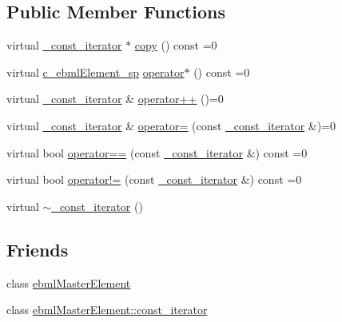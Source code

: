 \subsection*{Public Member Functions}
\begin{DoxyCompactItemize}
\item 
virtual \mbox{\hyperlink{classebml_1_1ebmlMasterElement_1_1__const__iterator}{\+\_\+const\+\_\+iterator}} $\ast$ \mbox{\hyperlink{classebml_1_1ebmlMasterElement_1_1__const__iterator_a64a4853ad363358987eb6492579cd503}{copy}} () const =0
\item 
virtual \mbox{\hyperlink{namespaceebml_a2deef4e8071531b32e3533f1bf978917}{c\+\_\+ebml\+Element\+\_\+sp}} \mbox{\hyperlink{classebml_1_1ebmlMasterElement_1_1__const__iterator_aa3e5459826695a9043745fbbaea9cd47}{operator$\ast$}} () const =0
\item 
virtual \mbox{\hyperlink{classebml_1_1ebmlMasterElement_1_1__const__iterator}{\+\_\+const\+\_\+iterator}} \& \mbox{\hyperlink{classebml_1_1ebmlMasterElement_1_1__const__iterator_a439f540325443a3c3a3acdcd8df81553}{operator++}} ()=0
\item 
virtual \mbox{\hyperlink{classebml_1_1ebmlMasterElement_1_1__const__iterator}{\+\_\+const\+\_\+iterator}} \& \mbox{\hyperlink{classebml_1_1ebmlMasterElement_1_1__const__iterator_a102cf8b36c0d8184680ef15594bb59fb}{operator=}} (const \mbox{\hyperlink{classebml_1_1ebmlMasterElement_1_1__const__iterator}{\+\_\+const\+\_\+iterator}} \&)=0
\item 
virtual bool \mbox{\hyperlink{classebml_1_1ebmlMasterElement_1_1__const__iterator_a936395ed4c0c189a92927bfdf1e28586}{operator==}} (const \mbox{\hyperlink{classebml_1_1ebmlMasterElement_1_1__const__iterator}{\+\_\+const\+\_\+iterator}} \&) const =0
\item 
virtual bool \mbox{\hyperlink{classebml_1_1ebmlMasterElement_1_1__const__iterator_ac62d190e9da49236835f8219ec307d22}{operator!=}} (const \mbox{\hyperlink{classebml_1_1ebmlMasterElement_1_1__const__iterator}{\+\_\+const\+\_\+iterator}} \&) const =0
\item 
virtual \mbox{\hyperlink{classebml_1_1ebmlMasterElement_1_1__const__iterator_a6138f42b88ff06379d96a095a12ed136}{$\sim$\+\_\+const\+\_\+iterator}} ()
\end{DoxyCompactItemize}
\subsection*{Friends}
\begin{DoxyCompactItemize}
\item 
class \mbox{\hyperlink{classebml_1_1ebmlMasterElement_1_1__const__iterator_ad88e86cba72e9332a4693c1c6009b281}{ebml\+Master\+Element}}
\item 
class \mbox{\hyperlink{classebml_1_1ebmlMasterElement_1_1__const__iterator_a734affd0f736e2e4e03ab2cf8a9f9b26}{ebml\+Master\+Element\+::const\+\_\+iterator}}
\end{DoxyCompactItemize}


